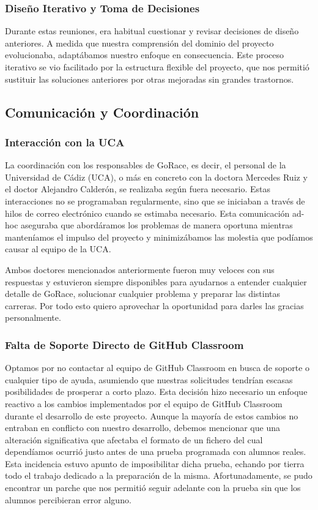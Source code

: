\subsubsection{Diseño Iterativo y Toma de Decisiones}
Durante estas reuniones, era habitual cuestionar y revisar decisiones de diseño anteriores. A medida que nuestra comprensión del dominio del proyecto evolucionaba, adaptábamos nuestro enfoque en consecuencia. Este proceso iterativo se vio facilitado por la estructura flexible del proyecto, que nos permitió sustituir las soluciones anteriores por otras mejoradas sin grandes trastornos.

\subsection{Comunicación y Coordinación}

\subsubsection{Interacción con la UCA}
La coordinación con los responsables de GoRace, es decir, el personal de la Universidad de Cádiz (\acrshort{UCA}), o más en concreto con la doctora Mercedes Ruiz y el doctor Alejandro Calderón, se realizaba según fuera necesario. Estas interacciones no se programaban regularmente, sino que se iniciaban a través de hilos de correo electrónico cuando se estimaba necesario. Esta comunicación ad-hoc aseguraba que abordáramos los problemas de manera oportuna mientras manteníamos el impulso del proyecto y minimizábamos las molestia que podíamos causar al equipo de la UCA.

Ambos doctores mencionados anteriormente fueron muy veloces con sus respuestas y estuvieron siempre disponibles para ayudarnos a entender cualquier detalle de GoRace, solucionar cualquier problema y preparar las distintas carreras. Por todo esto quiero aprovechar la oportunidad para darles las gracias personalmente.

\subsubsection{Falta de Soporte Directo de GitHub Classroom}
Optamos por no contactar al equipo de GitHub Classroom en busca de soporte o cualquier tipo de ayuda, asumiendo que nuestras solicitudes tendrían escasas posibilidades de prosperar a corto plazo. Esta decisión hizo necesario un enfoque reactivo a los cambios implementados por el equipo de GitHub Classroom durante el desarrollo de este proyecto. Aunque la mayoría de estos cambios no entraban en conflicto con nuestro desarrollo, debemos mencionar que una alteración significativa que afectaba el formato de un fichero del cual dependíamos ocurrió justo antes de una prueba programada con alumnos reales. Esta incidencia estuvo apunto de imposibilitar dicha prueba, echando por tierra todo el trabajo dedicado a la preparación de la misma. Afortunadamente, se pudo encontrar un parche que nos permitió seguir adelante con la prueba sin que los alumnos percibieran error alguno.

